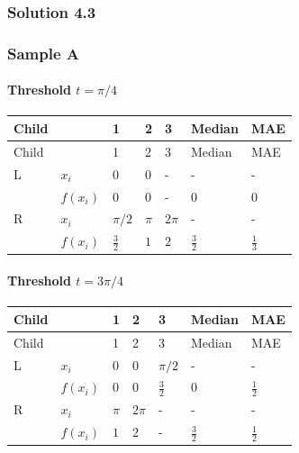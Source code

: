 \documentclass[10pt]{article}
\begin{document}
\subsubsection*{Solution 4.3}
\subsubsection*{Sample A}
\paragraph*{Threshold $t=\pi/4$}
\begingroup
\small
\setlength{\tabcolsep}{4pt}
\begin{longtable}{l|l|l|l|l|l|l}
Child &  & 1 & 2 & 3 & Median & MAE \\
\hline
\endfirsthead
Child &  & 1 & 2 & 3 & Median & MAE \\
\hline
\endhead
L & $x_i$ & $0$ & $0$ & - & - & - \\[3pt]
 & $f(x_i)$ & $0$ & $0$ & - & $0$ & $0$ \\[3pt]
R & $x_i$ & $\pi/2$ & $\pi$ & $2\pi$ & - & - \\[3pt]
 & $f(x_i)$ & $\frac{3}{2}$ & $1$ & $2$ & $\frac{3}{2}$ & $\frac{1}{3}$ \\[3pt]
\end{longtable}
\endgroup
\paragraph*{Threshold $t=3\pi/4$}
\begingroup
\small
\setlength{\tabcolsep}{4pt}
\begin{longtable}{l|l|l|l|l|l|l}
Child &  & 1 & 2 & 3 & Median & MAE \\
\hline
\endfirsthead
Child &  & 1 & 2 & 3 & Median & MAE \\
\hline
\endhead
L & $x_i$ & $0$ & $0$ & $\pi/2$ & - & - \\[3pt]
 & $f(x_i)$ & $0$ & $0$ & $\frac{3}{2}$ & $0$ & $\frac{1}{2}$ \\[3pt]
R & $x_i$ & $\pi$ & $2\pi$ & - & - & - \\[3pt]
 & $f(x_i)$ & $1$ & $2$ & - & $\frac{3}{2}$ & $\frac{1}{2}$ \\[3pt]
\end{longtable}
\endgroup
\end{document}
